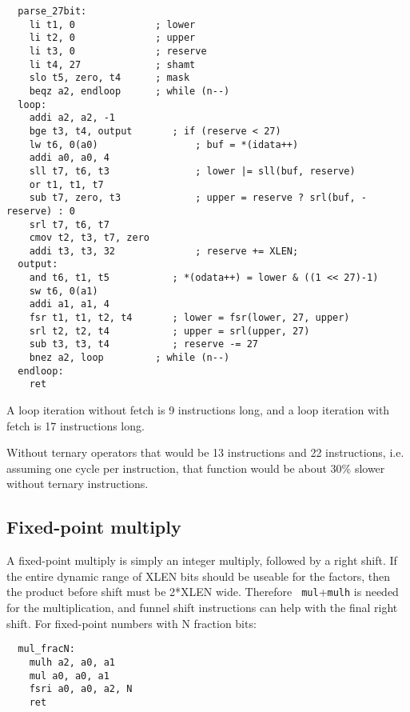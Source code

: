 \begin{minipage}{\linewidth}
\begin{verbatim}
  parse_27bit:
    li t1, 0              ; lower
    li t2, 0              ; upper
    li t3, 0              ; reserve
    li t4, 27             ; shamt
    slo t5, zero, t4      ; mask
    beqz a2, endloop      ; while (n--)
  loop:
    addi a2, a2, -1
    bge t3, t4, output       ; if (reserve < 27)
    lw t6, 0(a0)                 ; buf = *(idata++)
    addi a0, a0, 4
    sll t7, t6, t3               ; lower |= sll(buf, reserve)
    or t1, t1, t7
    sub t7, zero, t3             ; upper = reserve ? srl(buf, -reserve) : 0
    srl t7, t6, t7
    cmov t2, t3, t7, zero
    addi t3, t3, 32              ; reserve += XLEN;
  output:
    and t6, t1, t5           ; *(odata++) = lower & ((1 << 27)-1)
    sw t6, 0(a1)
    addi a1, a1, 4
    fsr t1, t1, t2, t4       ; lower = fsr(lower, 27, upper)
    srl t2, t2, t4           ; upper = srl(upper, 27)
    sub t3, t3, t4           ; reserve -= 27
    bnez a2, loop         ; while (n--)
  endloop:
    ret
\end{verbatim}
\end{minipage}

A loop iteration without fetch is 9 instructions long, and a loop iteration
with fetch is 17 instructions long.

Without ternary operators that would be 13 instructions and 22 instructions,
i.e. assuming one cycle per instruction, that function would be about 30\%
slower without ternary instructions.

\subsection{Fixed-point multiply}

A fixed-point multiply is simply an integer multiply, followed by a right
shift. If the entire dynamic range of XLEN bits should be useable for the
factors, then the product before shift must be 2*XLEN wide. Therefore {\tt
mul}+{\tt mulh} is needed for the multiplication, and funnel shift instructions
can help with the final right shift. For fixed-point numbers with N fraction
bits:

\begin{minipage}{\linewidth}
\begin{verbatim}
  mul_fracN:
    mulh a2, a0, a1
    mul a0, a0, a1
    fsri a0, a0, a2, N
    ret
\end{verbatim}
\end{minipage}

